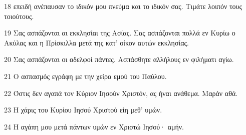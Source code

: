 \par 18 επειδή ανέπαυσαν το ιδικόν μου πνεύμα και το ιδικόν σας. Τιμάτε λοιπόν τους τοιούτους.
\par 19 Σας ασπάζονται αι εκκλησίαι της Ασίας. Σας ασπάζονται πολλά εν Κυρίω ο Ακύλας και η Πρίσκιλλα μετά της κατ' οίκον αυτών εκκλησίας.
\par 20 Σας ασπάζονται οι αδελφοί πάντες. Ασπάσθητε αλλήλους εν φιλήματι αγίω.
\par 21 Ο ασπασμός εγράφη με την χείρα εμού του Παύλου.
\par 22 Όστις δεν αγαπά τον Κύριον Ιησούν Χριστόν, ας ήναι ανάθεμα. Μαράν αθά.
\par 23 Η χάρις του Κυρίου Ιησού Χριστού είη μεθ' υμών.
\par 24 Η αγάπη μου μετά πάντων υμών εν Χριστώ Ιησού· αμήν.


